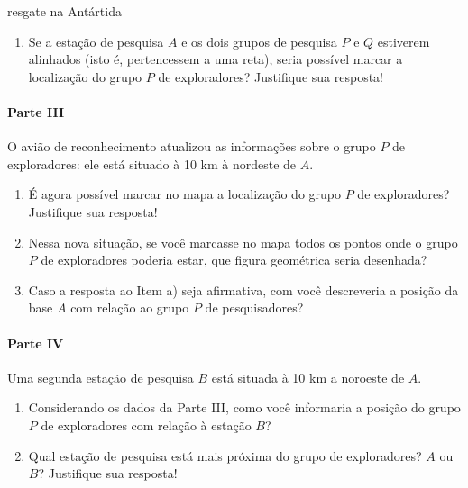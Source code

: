 \begin{task}{resgate na Antártida}
\begin{enumerate}
\item {} 
Se a estação de pesquisa \(A\) e os dois grupos de pesquisa \(P\) e \(Q\) estiverem alinhados (isto é, pertencessem a uma reta), seria possível marcar a localização do grupo \(P\) de exploradores? Justifique sua resposta!

\end{enumerate}

\paragraph{Parte III}

O avião de reconhecimento atualizou as informações sobre o grupo \(P\) de exploradores: ele está situado à 10 km à nordeste de \(A\).
\begin{enumerate}
\item {} 
É agora possível marcar no mapa a localização do grupo \(P\) de exploradores? Justifique sua resposta!

\item {} 
Nessa nova situação, se você marcasse no mapa todos os pontos onde o grupo \(P\) de exploradores poderia estar, que figura geométrica seria desenhada?

\item {} 
Caso a resposta ao Item a) seja afirmativa, com você descreveria a posição da base \(A\) com relação ao grupo \(P\) de pesquisadores?

\end{enumerate}

\paragraph{Parte IV}

Uma segunda estação de pesquisa \(B\) está situada à 10 km a noroeste de \(A\).
\begin{enumerate}
\item {} 
Considerando os dados da Parte III, como você informaria a posição do grupo \(P\) de exploradores com relação à estação \(B\)?

\item {} 
Qual estação de pesquisa está mais próxima do grupo de exploradores? \(A\) ou \(B\)? Justifique sua resposta!

\end{enumerate}
\end{task}
\clearmargin
